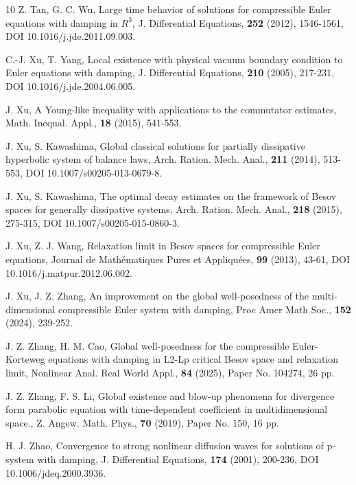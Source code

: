 \documentclass{amsart}
\theoremstyle{definition}
\theoremstyle{remark}
\numberwithin{equation}{section}
\begin{document}
\begin{thebibliography}{10}
Z. Tan, G. C. Wu, Large time behavior of solutions for compressible Euler equations with damping in $R^3$, J. Differential Equations, {\bf 252} (2012), 1546-1561, DOI 10.1016/j.jde.2011.09.003.

C.-J. Xu, T. Yang, Local existence with physical vacuum boundary condition to Euler equations with damping, J. Differential Equations, {\bf 210} (2005), 217-231, DOI 10.1016/j.jde.2004.06.005.

J. Xu, A Young-like inequality with applications to the commutator estimates, Math. Inequal. Appl., {\bf 18} (2015), 541-553.

J. Xu, S. Kawashima, Global classical solutions for partially dissipative hyperbolic system of balance laws, Arch. Ration. Mech. Anal., {\bf 211} (2014), 513-553, DOI 10.1007/s00205-013-0679-8.

J. Xu, S. Kawashima, The optimal decay estimates on the framework of Besov spaces for generally dissipative systems, Arch. Ration. Mech. Anal., {\bf 218} (2015), 275-315, DOI 10.1007/s00205-015-0860-3.

J. Xu, Z. J. Wang, Relaxation limit in Besov spaces for compressible Euler equations, Journal de Math\'{e}matiques Pures et Appliqu\'{e}es, {\bf 99} (2013), 43-61, DOI 10.1016/j.matpur.2012.06.002.

J. Xu, J. Z. Zhang, An improvement on the global well-posedness of the multi-dimensional compressible Euler system with
damping, Proc Amer Math Soc., {\bf 152} (2024), 239-252.

J. Z. Zhang, H. M. Cao, Global well-posedness for the compressible Euler-Korteweg equations with damping in L2-Lp critical Besov space and relaxation limit, Nonlinear Anal. Real World Appl., {\bf 84} (2025), Paper No. 104274, 26 pp.

J. Z. Zhang, F. S. Li, Global existence and blow-up phenomena for divergence form parabolic equation with time-dependent coefficient in multidimensional space., Z. Angew. Math. Phys., {\bf 70} (2019), Paper No. 150, 16 pp.

H. J. Zhao, Convergence to strong nonlinear diffusion waves for solutions of p-system with damping, J. Differential Equations, {\bf 174} (2001), 200-236, DOI 10.1006/jdeq.2000.3936.



\end{thebibliography}
\end{document}
